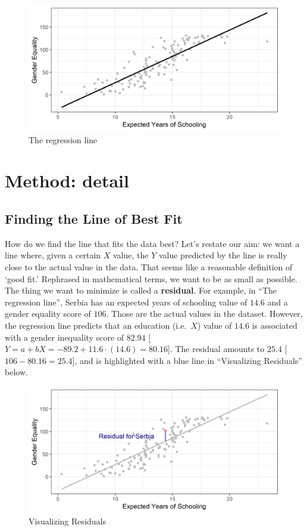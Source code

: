 \documentclass{book}
\begin{document}
\begin{figure}
\centering
\includegraphics{images/largen/line.png}
\caption{The regression line}
\end{figure}

\hypertarget{method-detail}{%
\section{Method: detail}\label{method-detail}}

\hypertarget{finding-the-line-of-best-fit}{%
\subsection{Finding the Line of Best Fit}\label{finding-the-line-of-best-fit}}

How do we find the line that fits the data best? Let's restate our aim: we
want a line where, given a certain \(X\) value, the \(Y\) value predicted by
the line is really close to the actual value in the data. That seems like a
reasonable definition of `good fit.' Rephrased in mathematical terms, we want
to be as small as possible. The thing we want to minimize is called a
\textbf{residual}. For example, in ``The regression line'', Serbia has an
expected years of schooling value of \(14.6\) and a gender equality score of
\(106\). Those are the actual values in the dataset. However, the regression
line predicts that an education (i.e.~\(X\)) value of \(14.6\) is associated
with a gender inequality score of \(82.94\)
{[}{\(Y= a+ bX= -89.2 + 11.6 \cdot(14.6) = 80.16\)}{]}. The residual amounts
to \(25.4\) {[}{\(106 - 80.16=25.4\)}{]}, and is highlighted with a blue line
in ``Visualizing Residuals'' below.

\begin{figure}
\centering
\includegraphics{images/largen/residuals.png}
\caption{Visualizing Residuals}
\end{figure}
\end{document}

